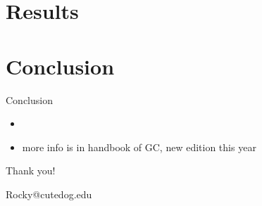 \documentclass[10pt, xcolor=x11names,compress]{beamer}
\begin{document}
\section{Results}

\section{Conclusion}
\begin{frame}{Conclusion}
\begin{itemize}
    \item 
    \item  more info is in handbook of GC, new edition this year
\end{itemize}
    
\end{frame}


\begin{frame}
 \begin{center}
		{Thank you!}\\
		\bigskip\bigskip %
		
		{\LARGE Rocky@cutedog.edu}
		
	\end{center}
\end{frame}
\end{document}
